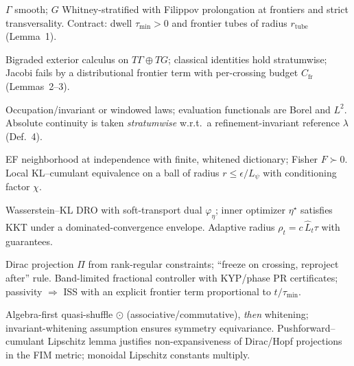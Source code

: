 \documentclass[10pt]{article}
\begin{document}
\begin{description}[leftmargin=*,style=nextline]
\item[Representation (Rep).] $\Gamma$ smooth; $G$ Whitney-stratified with Filippov prolongation at frontiers and strict transversality. Contract: dwell $\tau_{\min}>0$ and frontier tubes of radius $r_{\mathrm{tube}}$ (Lemma~1).
\item[Algebra (Alg).] Bigraded exterior calculus on $T\Gamma\oplus TG$; classical identities hold stratumwise; Jacobi fails by a distributional frontier term with per-crossing budget $C_{\mathrm{fr}}$ (Lemmas~2–3).
\item[Stochastic (Stoch).] Occupation/invariant or windowed laws; evaluation functionals are Borel and $L^2$. Absolute continuity is taken \emph{stratumwise} w.r.t.\ a refinement-invariant reference $\lambda$ (Def.~4). 
\item[Inference (Inf).] EF neighborhood at independence with finite, whitened dictionary; Fisher $F\!\succ\!0$. Local KL–cumulant equivalence on a ball of radius $r\le \epsilon/L_\psi$ with conditioning factor $\chi$.
\item[Closure (Clos).] Wasserstein--KL DRO with soft-transport dual $\varphi_\eta$; inner optimizer $\eta^\star$ satisfies KKT under a dominated-convergence envelope. Adaptive radius $\rho_t=c\,\widehat L_t\tau$ with guarantees.
\item[Control (Ctrl).] Dirac projection $\Pi$ from rank-regular constraints; “freeze on crossing, reproject after” rule. Band-limited fractional controller with KYP/phase PR certificates; passivity $\Rightarrow$ ISS with an explicit frontier term proportional to $t/\tau_{\min}$.
\item[Composition (Comp).] Algebra-first quasi-shuffle $\odot$ (associative/commutative), \emph{then} whitening; invariant-whitening assumption ensures symmetry equivariance. Pushforward–cumulant Lipschitz lemma justifies non-expansiveness of Dirac/Hopf projections in the FIM metric; monoidal Lipschitz constants multiply.
\end{description}
\end{document}
